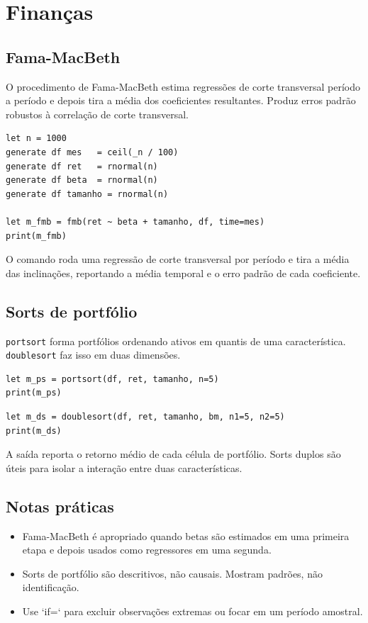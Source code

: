 \chapter{Finanças}

\section{Fama-MacBeth}

O procedimento de Fama-MacBeth estima regressões de corte transversal
período a período e depois tira a média dos coeficientes resultantes.
Produz erros padrão robustos à correlação de corte transversal.

\begin{lstlisting}[caption={Regressão Fama-MacBeth}]
let n = 1000
generate df mes   = ceil(_n / 100)
generate df ret   = rnormal(n)
generate df beta  = rnormal(n)
generate df tamanho = rnormal(n)

let m_fmb = fmb(ret ~ beta + tamanho, df, time=mes)
print(m_fmb)
\end{lstlisting}

O comando roda uma regressão de corte transversal por período e tira a
média das inclinações, reportando a média temporal e o erro padrão de
cada coeficiente.

\section{Sorts de portfólio}

\texttt{portsort} forma portfólios ordenando ativos em quantis de uma
característica. \texttt{doublesort} faz isso em duas dimensões.

\begin{lstlisting}[caption={Sort de portfólio simples}]
let m_ps = portsort(df, ret, tamanho, n=5)
print(m_ps)
\end{lstlisting}

\begin{lstlisting}[caption={Sort duplo}]
let m_ds = doublesort(df, ret, tamanho, bm, n1=5, n2=5)
print(m_ds)
\end{lstlisting}

A saída reporta o retorno médio de cada célula de portfólio. Sorts
duplos são úteis para isolar a interação entre duas características.

\section{Notas práticas}

\begin{itemize}
\item Fama-MacBeth é apropriado quando betas são estimados em uma
      primeira etapa e depois usados como regressores em uma segunda.
\item Sorts de portfólio são descritivos, não causais. Mostram padrões,
      não identificação.
\item Use `if=` para excluir observações extremas ou focar em um
      período amostral.
\end{itemize}
